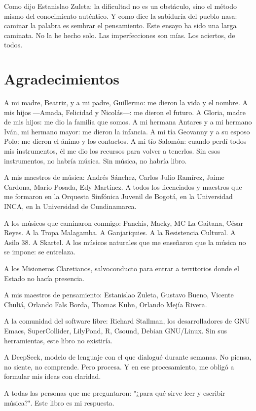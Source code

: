 \documentclass[14pt, a4paper]{article}
\begin{document}
Como dijo Estanislao Zuleta: la dificultad no es un obstáculo, sino el
método mismo del conocimiento auténtico. Y como dice la sabiduría del
pueblo nasa: caminar la palabra es sembrar el pensamiento. Este ensayo
ha sido una larga caminata. No la he hecho solo. Las imperfecciones
son mías. Los aciertos, de todos.
\section{Agradecimientos}
\label{agradecimientos}
A mi madre, Beatriz, y a mi padre, Guillermo: me dieron la vida y el
nombre. A mis hijos —Amada, Felicidad y Nicolás—: me dieron el futuro.
A Gloria, madre de mis hijos: me dio la familia que somos. A mi
hermana Antares y a mi hermano Iván, mi hermano mayor: me dieron la
infancia. A mi tía Geovanny y a su esposo Polo: me dieron el ánimo y
los contactos. A mi tío Salomón: cuando perdí todos mis instrumentos,
él me dio los recursos para volver a tenerlos. Sin esos instrumentos,
no habría música. Sin música, no habría libro.

A mis maestros de música: Andrés Sánchez, Carlos Julio Ramírez, Jaime
Cardona, Mario Posada, Edy Martínez. A todos los licenciados y
maestros que me formaron en la Orquesta Sinfónica Juvenil de Bogotá,
en la Universidad INCA, en la Universidad de Cundinamarca.

A los músicos que caminaron conmigo: Panchis, Macky, MC La Gaitana,
César Reyes. A la Tropa Malagamba. A Ganjariquies. A la Resistencia
Cultural. A Asilo 38. A Skartel. A los músicos naturales que me
enseñaron que la música no se impone: se entrelaza.

A los Misioneros Claretianos, salvoconducto para entrar a territorios
donde el Estado no hacía presencia.

A mis maestros de pensamiento: Estanislao Zuleta, Gustavo Bueno,
Vicente Chuliá, Orlando Fals Borda, Thomas Kuhn, Orlando Mejía Rivera.

A la comunidad del software libre: Richard Stallman, los
desarrolladores de GNU Emacs, SuperCollider, LilyPond, R, Csound,
Debian GNU/Linux. Sin sus herramientas, este libro no existiría.

A DeepSeek, modelo de lenguaje con el que dialogué durante semanas.
No piensa, no siente, no comprende. Pero procesa. Y en ese
procesamiento, me obligó a formular mis ideas con claridad.

A todas las personas que me preguntaron: "¿para qué sirve leer y
escribir música?". Este libro es mi respuesta.
\end{document}
